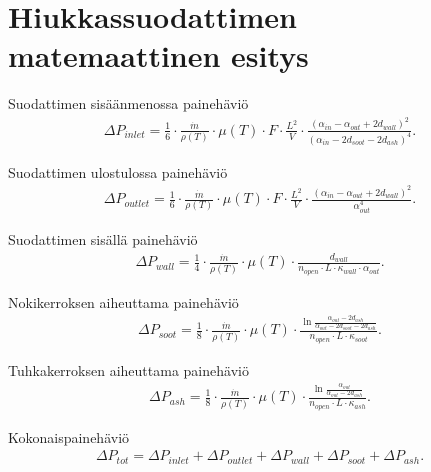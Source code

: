 \section{Hiukkassuodattimen matemaattinen esitys}

\begin{figure}[H]
    \centering 
    
    \caption{}
    \label{fig:blocks1}
\end{figure}

Suodattimen sisäänmenossa painehäviö
\begin{align}
    \Delta P_{inlet} = \frac{1}{6} \cdot
    \frac{\dot{m}}{\rho(T)} \cdot \mu(T) 
    \cdot F \cdot \frac{L^2}{V} \cdot \frac{(\alpha_{in}-\alpha_{out}+2 d_{wall})^2}{(\alpha_{in}-2d_{soot}-2d_{ash})^4}.
    \label{eq:PDinletchannel}
\end{align}

Suodattimen ulostulossa painehäviö
\begin{align}
    \Delta P_{outlet} = \frac{1}{6} \cdot
    \frac{\dot{m}}{\rho(T)} \cdot \mu(T) 
    \cdot F \cdot \frac{L^2}{V} \cdot \frac{(\alpha_{in}-\alpha_{out}+2 d_{wall})^2}{\alpha_{out}^4}.
    \label{eq:PDoutletopen}
\end{align}

Suodattimen sisällä painehäviö 
\begin{align}
    \Delta P_{wall} = \frac{1}{4} \cdot
    \frac{\dot{m}}{\rho(T)} \cdot \mu(T) 
    \cdot \frac{d_{wall}}
    {n_{open}\cdot L \cdot \kappa_{wall} \cdot \alpha_{out}}.
    \label{eq:PDfilterwall}
\end{align}

Nokikerroksen aiheuttama painehäviö
\begin{align}
    \Delta P_{soot} =  \frac{1}{8} \cdot
    \frac{\dot{m}}{\rho(T)} \cdot \mu(T) \cdot 
    \frac{\ln{\frac{\alpha_{out}-2d_{ash}}{\alpha_{out}-2d_{soot}-2d_{ash}}}}
    {n_{open}\cdot L \cdot \kappa_{soot}}.
    \label{eq:PDsootlayer}
\end{align}

Tuhkakerroksen aiheuttama painehäviö
\begin{align}
    \Delta P_{ash} = \frac{1}{8} \cdot
    \frac{\dot{m}}{\rho(T)} \cdot \mu(T) \cdot 
    \frac{\ln{\frac{\alpha_{out}}{\alpha_{out}-2d_{ash}}}}
    {n_{open}\cdot L \cdot \kappa_{ash}}.
    \label{eq:PDashlayer}
\end{align}

Kokonaispainehäviö
\begin{align}
    \Delta P_{tot}  = \Delta P_{inlet} +  \Delta P_{outlet} + \Delta P_{wall} + \Delta P_{soot} +  \Delta P_{ash}.
\end{align}